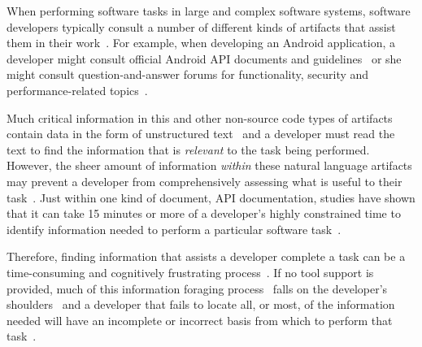 

When performing software tasks in large and complex software systems, software developers typically consult a number of different kinds of artifacts that assist them in their work~\cite{Starke2009, Meyer2017}. For example, 
when developing an Android application, a developer might consult official Android API documents and guidelines~\cite{robillard2011field, umarji2008archetypal} or she might consult question-and-answer forums for functionality, security and performance-related topics~\cite{parnin2012, silva2019}.




Much critical information in this and other non-source code types of artifacts 
contain data in the form of unstructured text~\cite{Bavota2016} and 
a developer must read the text to find the information that is \textit{relevant} to the task being performed.
However, the sheer amount of information \textit{within} these natural language artifacts may prevent a developer from comprehensively assessing what is useful to their task~\cite{Murphy2005}.  Just within one kind of document, API
documentation, studies have shown that it can take 15 minutes or more
of a developer's highly constrained time to identify 
information needed to perform a particular software task~\cite{endrikat2014, Meyer2017}.


Therefore, finding information that assists a developer complete a task can be a time-consuming
and cognitively frustrating process~\cite{Begel2008,
robillard2011field}.
If no tool support is provided, much of this information foraging process~\cite{Pirolli1999, Just1980} falls on the developer's shoulders~\cite{gonccalves2011, Ko2006a, Bystrom1995} and a developer that fails to locate all, or most, of the information needed
 will have an incomplete or incorrect basis from which to perform that task~\cite{Murphy2005}.









